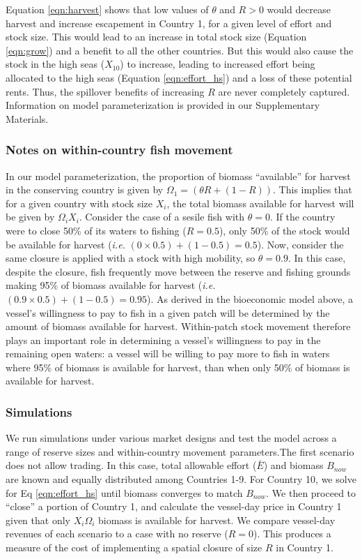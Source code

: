 \documentclass[12pt]{article}
\begin{document}
\noindent Equation \ref{eqn:harvest} shows that low values of $\theta$ and $R > 0$ would decrease harvest and increase escapement in Country 1, for a given level of effort and stock size. This would lead to an increase in total stock size (Equation \ref{eqn:grow}) and a benefit to all the other countries. But this would also cause the stock in the high seas ($X_{10}$) to increase, leading to increased effort being allocated to the high seas (Equation \ref{eqn:effort_hs}) and a loss of these potential rents. Thus, the spillover benefits of increasing $R$ are never completely captured. Information on model parameterization is provided in our Supplementary Materials.

\subsubsection{Notes on within-country fish movement}

In our model parameterization, the proportion of biomass ``available'' for harvest in the conserving country is given by  $\Omega_1 = (\theta R + (1 - R))$. This implies that for a given country with stock size $X_i$, the total biomass available for harvest will be given by $\Omega_i X_i$. Consider the case of a sesile fish with $\theta = 0$. If the country were to close 50\% of its waters to fishing ($R = 0.5$), only 50\% of the stock would be available for harvest (\emph{i.e.} $(0 \times 0.5) + (1 - 0.5) = 0.5$). Now, consider the same closure is applied with a stock with high mobility, so $\theta = 0.9$. In this case, despite the closure, fish frequently move between the reserve and fishing grounds making 95\% of biomass available for harvest (\emph{i.e.} $(0.9 \times 0.5) + (1 - 0.5) = 0.95$). As derived in the bioeconomic model above, a vessel's willingness to pay to fish in a given patch will be determined by the amount of biomass available for harvest. Within-patch stock movement therefore plays an important role in determining a vessel's willingness to pay in the remaining open waters: a vessel will be willing to pay more to fish in waters where 95\% of biomass is available for harvest, than when only 50\% of biomass is available for harvest.

\subsubsection{Simulations}

We run simulations under various market designs and test the model across a range of reserve sizes and within-country movement parameters.The first scenario does not allow trading. In this case, total allowable effort ($\bar{E}$) and biomass $B_{now}$ are known and equally distributed among Countries 1-9. For Country 10, we solve for Eq \ref{eqn:effort_hs} until biomass converges to match $B_{now}$. We then proceed to ``close'' a portion of Country 1, and calculate the vessel-day price in Country 1 given that only $X_i\Omega_i$ biomass is available for harvest. We compare vessel-day revenues of each scenario to a case with no reserve ($R = 0$). This produces a measure of the cost of implementing a spatial closure of size $R$ in Country 1.
\end{document}
